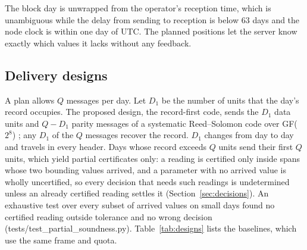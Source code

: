 The block day is unwrapped from the operator's reception time, which is unambiguous while the delay from sending to reception is below 63 days and the node clock is within one day of UTC. The planned positions let the server know exactly which values it lacks without any feedback.

\subsection{Delivery designs}
\label{sec:designs}
A plan allows $Q$ messages per day. Let $D_1$ be the number of units that the day's record occupies. The proposed design, the record-first code, sends the $D_1$ data units and $Q - D_1$ parity messages of a systematic Reed--Solomon code over GF($2^8$) \citep{reed1960}; any $D_1$ of the $Q$ messages recover the record. $D_1$ changes from day to day and travels in every header. Days whose record exceeds $Q$ units send their first $Q$ units, which yield partial certificates only: a reading is certified only inside spans whose two bounding values arrived, and a parameter with no arrived value is wholly uncertified, so every decision that needs such readings is undetermined unless an already certified reading settles it (Section~\ref{sec:decisions}). An exhaustive test over every subset of arrived values on small days found no certified reading outside tolerance and no wrong decision (tests/test_partial_soundness.py). Table~\ref{tab:designs} lists the baselines, which use the same frame and quota.

